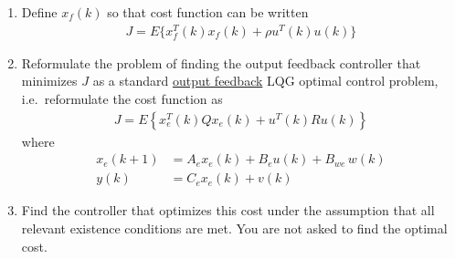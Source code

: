 \begin{enumerate}
    \item
    Define $x_f(k)$ so that cost function can be written
    \begin{align*}
        J = E \{ x_f^T(k) x_f(k) + \rho u^T(k) u(k) \}
    \end{align*}

    \item
    Reformulate the problem of finding the output feedback controller that minimizes $J$ as a standard \underline{output feedback} LQG optimal control problem, i.e.\ reformulate the cost function as
    \begin{align*}
        J = E \left\{ x_e^T(k) Q x_e(k) + u^T(k) R u(k) \right\}
    \end{align*}
    where
    \begin{align*}
        x_e(k+1) & = A_e x_e(k) + B_e u(k) + B_{we} \, w(k) \\
        y(k) & = C_e x_e(k) + v(k)
    \end{align*}

    \item
    Find the controller that optimizes this cost under the assumption that all relevant existence conditions are met. You are not asked to find the optimal cost.

\end{enumerate} 
